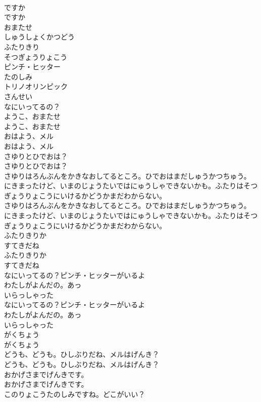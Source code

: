 \documentclass[8pt]{extreport}
\begin{document}
\begin{CJK}{UTF8}{min}
\\	ですか
\\	ですか
\\	おまたせ
\\	しゅうしょくかつどう
\\	ふたりきり
\\	そつぎょうりょこう
\\	ピンチ・ヒッター
\\	たのしみ
\\	トリノオリンピック
\\	さんせい
\\	なにいってるの？
\\	ようこ、おまたせ
\\	ようこ、おまたせ
\\	おはよう、メル
\\	おはよう、メル
\\	さゆりとひでおは？
\\	さゆりとひでおは？
\\	さゆりはろんぶんをかきなおしてるところ。ひでおはまだしゅうかつちゅう。
\\	にきまったけど、いまのじょうたいではにゅうしゃできないかも。ふたりはそつぎょうりょこうにいけるかどうかまだわからない。
\\	さゆりはろんぶんをかきなおしてるところ。ひでおはまだしゅうかつちゅう。
\\	にきまったけど、いまのじょうたいではにゅうしゃできないかも。ふたりはそつぎょうりょこうにいけるかどうかまだわからない。
\\	ふたりきりか
\\	すてきだね
\\	ふたりきりか
\\	すてきだね
\\	なにいってるの？ピンチ・ヒッターがいるよ
\\	わたしがよんだの。あっ
\\	いらっしゃった
\\	なにいってるの？ピンチ・ヒッターがいるよ
\\	わたしがよんだの。あっ
\\	いらっしゃった
\\	がくちょう
\\	がくちょう
\\	どうも、どうも。ひしぶりだね、メルはげんき？
\\	どうも、どうも。ひしぶりだね、メルはげんき？
\\	おかげさまでげんきです。
\\	おかげさまでげんきです。
\\	このりょこうたのしみですね。どこがいい？

\end{CJK}
\end{document}
